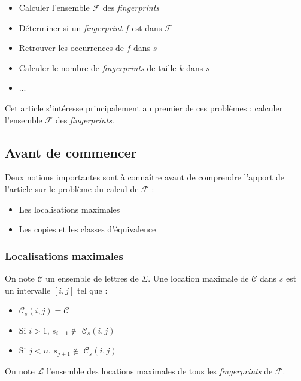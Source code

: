 \documentclass[a4paper]{article}
\begin{document}
\begin{itemize}
	\item Calculer l'ensemble $\mathcal{F}$ des \emph{fingerprints}
	\item Déterminer si un \emph{fingerprint} $f$ est dans $\mathcal{F}$
	\item Retrouver les occurrences de $f$ dans $s$
	\item Calculer le nombre de \emph{fingerprints} de taille $k$ dans $s$
	\item ...
\end{itemize}

Cet article s'intéresse principalement au premier de ces problèmes : calculer l'ensemble $\mathcal{F}$ des \emph{fingerprints}.

\subsection{Avant de commencer}

Deux notions importantes sont à connaître avant de comprendre l'apport de l'article sur le problème du calcul de $\mathcal{F}$ :

\begin{itemize}
	\item Les localisations maximales
	\item Les copies et les classes d'équivalence
\end{itemize}

\subsubsection{Localisations maximales}

On note $\mathcal{C}$ un ensemble de lettres de $\Sigma$. Une location maximale de $\mathcal{C}$ dans $s$ est un intervalle $[i,j]$ tel que : \newline
		
\begin{itemize}
	\item $\mathcal{C}_{s}(i,j) = \mathcal{C}$
	\item Si $i > 1$, $s_{i-1} \notin$ $\mathcal{C}_{s}(i,j)$
	\item Si $j < n$, $s_{j+1} \notin$ $\mathcal{C}_{s}(i,j)$
\end{itemize}

On note $\mathcal{L}$ l'ensemble des locations maximales de tous les \textit{fingerprints} de $\mathcal{F}$. \newline
\end{document}
